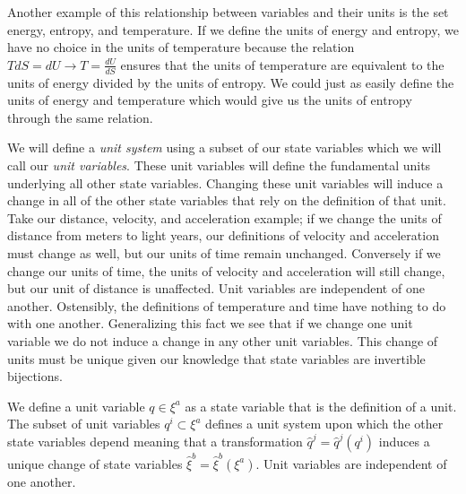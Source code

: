 \documentclass{article}[a4paper]
\begin{document}
	
	Another example of this relationship between variables and their units is the set energy, entropy, and temperature. If we define the units of energy and entropy, we have no choice in the units of temperature because the relation $T dS = dU \to T = \frac{dU}{dS}$ ensures that the units of temperature are equivalent to the units of energy divided by the units of entropy. We could just as easily define the units of energy and temperature which would give us the units of entropy through the same relation.
	
	 We will define a \textit{unit system} using a subset of our state variables which we will call our \textit{unit variables}. These unit variables will define the fundamental units underlying all other state variables. Changing these unit variables will induce a change in all of the other state variables that rely on the definition of that unit. Take our distance, velocity, and acceleration example; if we change the units of distance from meters to light years, our definitions of velocity and acceleration must change as well, but our units of time remain unchanged. Conversely if we change our units of time, the units of velocity and acceleration will still change, but our unit of distance is unaffected. Unit variables are independent of one another. Ostensibly, the definitions of temperature and time have nothing to do with one another.  Generalizing this fact we see that if we change one unit variable we do not induce a change in any other unit variables. This change of units must be unique given our knowledge that state variables are invertible bijections.

\begin{defn}
	We define a unit variable $q \in \xi^a$ as a state variable that is the definition of a unit. The subset of unit variables $q^i \subset \xi^a$ defines a unit system upon which the other state variables depend meaning that a transformation $\hat{q}^j = \hat{q}^j(q^i)$ induces a unique change of state variables $\hat{\xi}^b = \hat{\xi}^b(\xi^a)$. Unit variables are independent of one another.
\end{defn}

	
\end{document}
